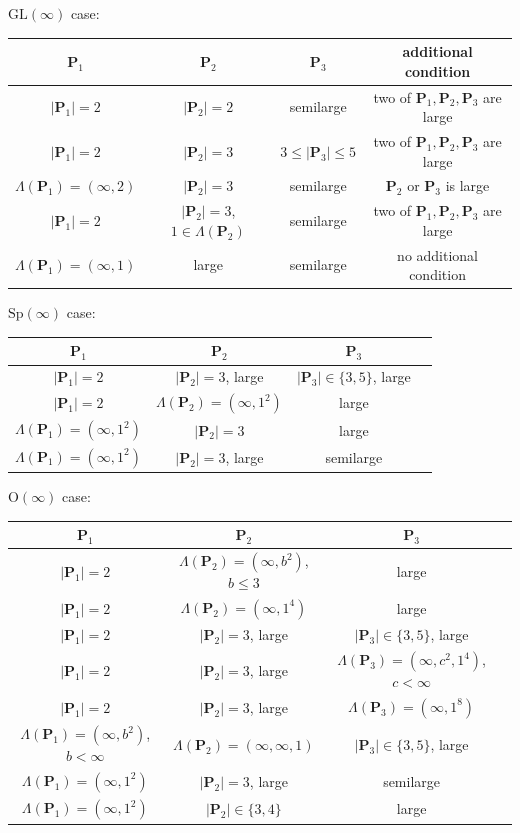 \documentclass[12pt]{amsart}
\newcommand{\GL}{\mathrm{GL}}
\newcommand{\Sp}{\mathrm{Sp}}
\renewcommand{\O}{\mathrm{O}}
\renewcommand{\P}{\mathbf{P}}
\newcommand{\length}[1]{|#1|}
\newcommand{\dims}[1]{\Lambda(#1)}
\numberwithin{equation}{section}
\theoremstyle{definition}
\begin{document}
\begin{table}[h]

$\GL(\infty)$ case:

{\scriptsize \begin{tabular}{|c|c|c|c|}
\hline
$\P_1$ & $\P_2$ & $\P_3$ & additional condition \\
\hline\hline
$\length{\P_1}=2$ & $\length{\P_2}=2$ & semilarge & two of $\P_1,\P_2,\P_3$ are large \\
\hline 
$\length{\P_1}=2$ & $\length{\P_2}=3$ & $3\leq \length{\P_3}\leq 5$ & two of $\P_1,\P_2,\P_3$ are large \\
\hline
$\dims{\P_1}=(\infty,2)$ & $\length{\P_2}=3$ & semilarge & $\P_2$ or $\P_3$ is large \\
\hline
$\length{\P_1}=2$ & $\length{\P_2}=3$, $1\in\dims{\P_2}$ & semilarge & two of $\P_1,\P_2,\P_3$ are large \\
\hline
$\dims{\P_1}=(\infty,1)$ & large & semilarge & no additional condition \\ \hline

\end{tabular}}

\bigskip
$\Sp(\infty)$ case:

{\scriptsize \begin{tabular}{|c|c|c|c|}
\hline
$\P_1$ & $\P_2$ & $\P_3$ \\
\hline\hline
$\length{\P_1}=2$ & $\length{\P_2}=3$, large & $\length{\P_3}\in\{3,5\}$, large \\
\hline 
$\length{\P_1}=2$ & $\dims{\P_2}=(\infty,1^2)$ & large  \\
\hline
$\dims{\P_1}=(\infty,1^2)$ & $\length{\P_2}=3$ & large  \\ \hline
$\dims{\P_1}=(\infty,1^2)$ & $\length{\P_2}=3$, large & semilarge  \\ \hline
\end{tabular}}

\bigskip
$\O(\infty)$ case:

{\scriptsize \begin{tabular}{|c|c|c|c|}
\hline
$\P_1$ & $\P_2$ & $\P_3$ \\
\hline\hline
$\length{\P_1}=2$ & $\dims{\P_2}=(\infty,b^2)$, $b\leq3$ & large \\
\hline 
$\length{\P_1}=2$ & $\dims{\P_2}=(\infty,1^4)$ & large  \\
\hline
$\length{\P_1}=2$ & $\length{\P_2}=3$, large & $\length{\P_3}\in\{3,5\}$, large  \\ \hline
$\length{\P_1}=2$ & $\length{\P_2}=3$, large & $\dims{\P_3}=(\infty,c^2,1^4)$, $c<\infty$  \\ \hline
$\length{\P_1}=2$ & $\length{\P_2}=3$, large & $\dims{\P_3}=(\infty,1^8)$ \\ \hline
$\dims{\P_1}=(\infty,b^2)$, $b<\infty$ & $\dims{\P_2}=(\infty,\infty,1)$ & $\length{\P_3}\in\{3,5\}$, large \\ \hline
$\dims{\P_1}=(\infty,1^2)$ & $\length{\P_2}=3$, large & semilarge  \\ \hline
$\dims{\P_1}=(\infty,1^2)$ & $\length{\P_2}\in\{3,4\}$ & large \\ \hline
\end{tabular}}


\end{table}
\end{document}
